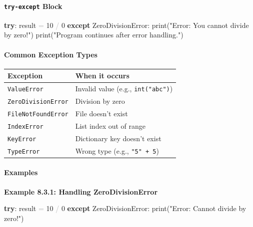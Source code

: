 \documentclass[
  justified,
  openright,
]{tufte-book}
\let\subsection\paragraph
\let\paragraph\paragraph
\newcommand{\KeywordTok}[1]{\textcolor{CodeKeyword}{\textbf{#1}}}  %
\newcommand{\StringTok}[1]{\textcolor{CodeString}{#1}}              %
\newcommand{\CodeNumTok}[1]{\textcolor{CodeNumber}{#1}}             %
\newcommand{\CodeAccentTok}[1]{\textcolor{CodeAccent}{#1}}          %
\newcommand{\OperatorTok}[1]{\textcolor{DarkGray}{#1}}              %
\newenvironment{Shaded}{%
  \begin{mdframed}[style=TufteCode]%
}{%
  \end{mdframed}%
}
\let\subsection\paragraph
\let\paragraph\paragraph
\begin{document}
\subsection{\texorpdfstring{\texttt{try-except}
Block}{try-except Block}}\label{try-except-block}

\begin{Shaded}
\begin{Highlighting}[]
\KeywordTok{try}:
    result \OperatorTok{=} \CodeNumTok{10} \OperatorTok{/} \CodeNumTok{0}
\KeywordTok{except} \CodeAccentTok{ZeroDivisionError}:
    print(\StringTok{"Error: You cannot divide by zero!"})
print(\StringTok{"Program continues after error handling."})
\end{Highlighting}
\end{Shaded}

\subsection{Common Exception Types}\label{common-exception-types}

\begin{fullwidth}{\def\LTcaptype{none} %
\begin{longtable}[]{@{}ll@{}}
\toprule\noalign{}
Exception & When it occurs \\
\midrule\noalign{}
\endhead
\bottomrule\noalign{}
\endlastfoot
\texttt{ValueError} & Invalid value (e.g., \texttt{int("abc")}) \\
\texttt{ZeroDivisionError} & Division by zero \\
\texttt{FileNotFoundError} & File doesn't exist \\
\texttt{IndexError} & List index out of range \\
\texttt{KeyError} & Dictionary key doesn't exist \\
\texttt{TypeError} & Wrong type (e.g., \texttt{"5"\ +\ 5}) \\
\end{longtable}
}
\end{fullwidth}

\subsection{Examples}\label{examples-13}

\textbf{Example 8.3.1: Handling ZeroDivisionError}

\begin{Shaded}
\begin{Highlighting}[]
\KeywordTok{try}:
    result \OperatorTok{=} \CodeNumTok{10} \OperatorTok{/} \CodeNumTok{0}
\KeywordTok{except} \CodeAccentTok{ZeroDivisionError}:
    print(\StringTok{"Error: Cannot divide by zero!"})
\end{Highlighting}
\end{Shaded}
\end{document}
